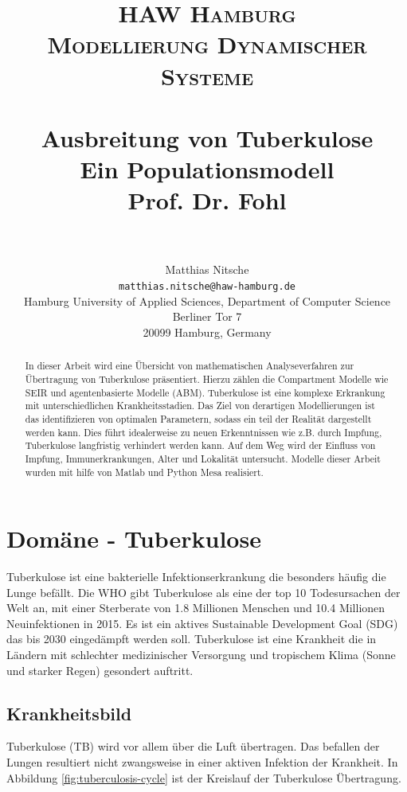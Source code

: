 \documentclass[paper=a4, fontsize=11pt, ngerman, abstract=on]{scrartcl}
\title {
  \normalfont \normalsize
  \textsc{HAW Hamburg} \\ [25pt]
  \textsc{Modellierung Dynamischer Systeme} \\ [15pt]
  \horrule{0.5pt} \\[0.4cm] %
  \huge Ausbreitung von Tuberkulose \\ [15pt] %
  \small Ein Populationsmodell \\ [15pt]
  \small Prof. Dr. Fohl \\
  \horrule{1pt} \\[0.5cm] %
}
\author{
  Matthias Nitsche \\
  \texttt{matthias.nitsche@haw-hamburg.de} \\
  \small{Hamburg University of Applied Sciences, Department of Computer Science} \\
  \small{Berliner Tor 7} \\
  \small{20099 Hamburg, Germany} \\
}
\numberwithin{equation}{section} %
\numberwithin{figure}{section} %
\numberwithin{table}{section} %
\begin{document}
\maketitle

\begin{abstract}
In dieser Arbeit wird eine Übersicht von mathematischen Analyseverfahren zur Übertragung von Tuberkulose präsentiert. Hierzu zählen die Compartment Modelle wie SEIR und agentenbasierte Modelle (ABM). Tuberkulose ist eine komplexe Erkrankung mit unterschiedlichen Krankheitsstadien. Das Ziel von derartigen Modellierungen ist das identifizieren von optimalen Parametern, sodass ein teil der Realität dargestellt werden kann. Dies führt idealerweise zu neuen Erkenntnissen wie z.B. durch Impfung, Tuberkulose langfristig verhindert werden kann. Auf dem Weg wird der Einfluss von Impfung, Immunerkrankungen, Alter und Lokalität untersucht. Modelle dieser Arbeit wurden mit hilfe von Matlab und Python Mesa realisiert.
\end{abstract}

\newpage

\renewcommand{\cftsecleader}{\cftdotfill{\cftdotsep}}
\tableofcontents

\newpage


\section{Domäne - Tuberkulose}

Tuberkulose ist eine bakterielle Infektionserkrankung die besonders häufig die Lunge befällt. Die WHO gibt Tuberkulose als eine der top 10 Todesursachen der Welt an, mit einer Sterberate von 1.8 Millionen Menschen und 10.4 Millionen Neuinfektionen in 2015. Es ist ein aktives Sustainable Development Goal (SDG) das bis 2030 eingedämpft werden soll. Tuberkulose ist eine Krankheit die in Ländern mit schlechter medizinischer Versorgung und tropischem Klima (Sonne und starker Regen) gesondert auftritt. \cite{WHOTB2016}

\subsection{Krankheitsbild}

Tuberkulose (TB) wird vor allem über die Luft übertragen. Das befallen der Lungen resultiert nicht zwangsweise in einer aktiven Infektion der Krankheit. In Abbildung \ref{fig:tuberculosis-cycle} ist der Kreislauf der Tuberkulose Übertragung.
\end{document}
